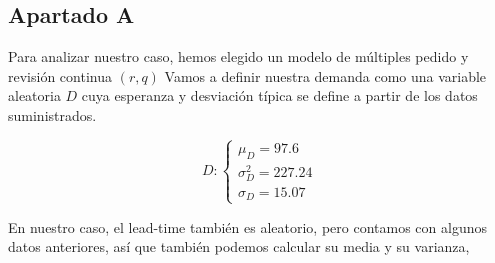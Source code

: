 \documentclass[a4paper,12pt]{article}
\begin{document}

\pagebreak

\subsection{Apartado A}\label{apartadoA}
Para analizar nuestro caso, hemos elegido un modelo de m\'ultiples pedido y revisi\'on continua $(r,q)$ 
Vamos a definir nuestra demanda como una variable aleatoria $D$ cuya esperanza y desviaci\'on t\'ipica se define a partir de los datos suministrados.


	\begin{equation*}
	D:  \left\lbrace \begin{array}{l}
		\mu_D = 97.6\\
		\sigma_D^2 = 227.24\\
		\sigma_D = 15.07
	\end{array}
	\right. 
	\end{equation*}

En nuestro caso, el lead-time tambi\'en es aleatorio, pero contamos con algunos datos anteriores, as\'i que tambi\'en podemos calcular su media y su varianza,

\end{document}
